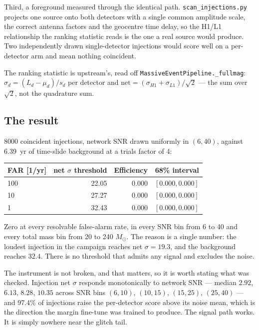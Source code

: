 \documentclass[11pt]{article}
\begin{document}
Third, a foreground measured through the identical path.
\texttt{scan\_injections.py} projects one source onto both detectors with a single
common amplitude scale, the correct antenna factors and the geocentre time delay, so the
H1/L1 relationship the ranking statistic reads is the one a real source would produce.
Two independently drawn single-detector injections would score well on a per-detector
arm and mean nothing coincident.

The ranking statistic is upstream's, read off \texttt{MassiveEventPipeline.\_fullmag}:
$\sigma_d = (L_d - \mu_d)/s_d$ per detector and
$\mathrm{net} = (\sigma_{H1} + \sigma_{L1})/\sqrt{2}$ --- the sum over $\sqrt{2}$, not
the quadrature sum.

\subsection*{The result}

8000 coincident injections, network SNR drawn uniformly in $(6, 40)$, against 6.39~yr of
time-slide background at a trials factor of 4:

\begin{center}
\begin{tabular}{lrrr}
\toprule
FAR [1/yr] & net $\sigma$ threshold & Efficiency & 68\% interval \\
\midrule
100 & 22.05 & $0.000$ & $[0.000, 0.000]$ \\
10  & 27.27 & $0.000$ & $[0.000, 0.000]$ \\
1   & 32.43 & $0.000$ & $[0.000, 0.000]$ \\
\bottomrule
\end{tabular}
\end{center}

Zero at every resolvable false-alarm rate, in every SNR bin from 6 to 40 and every total
mass bin from 20 to 240 $M_\odot$. The reason is a single number: the loudest injection
in the campaign reaches net $\sigma = 19.3$, and the background reaches $32.4$. There is
no threshold that admits any signal and excludes the noise.

The instrument is not broken, and that matters, so it is worth stating what was checked.
Injection net $\sigma$ responds monotonically to network SNR --- median $2.92$, $6.13$,
$8.28$, $10.35$ across SNR bins $(6,10)$, $(10,15)$, $(15,25)$, $(25,40)$ --- and 97.4\%
of injections raise the per-detector score above its noise mean, which is the direction
the margin fine-tune was trained to produce. The signal path works. It is simply
nowhere near the glitch tail.
\end{document}
